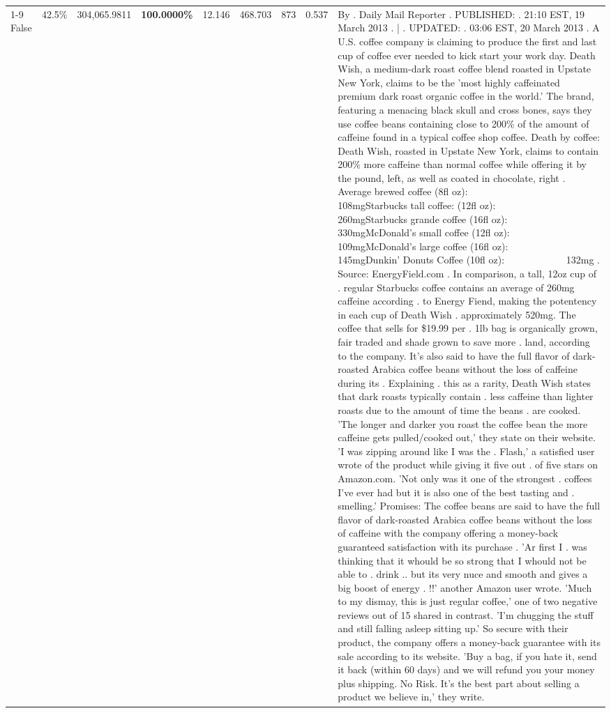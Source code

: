 \begin{table}[H]
{\begin{tabular}{lllrlllll}
\cline{1-9}
False & 42.5\% & 304,065.9811 & \bfseries \color{red} 100.0000\% & 12.146 & 468.703 & 873 & 0.537 & By . Daily Mail Reporter . PUBLISHED: . 21:10 EST, 19 March 2013 . | . UPDATED: . 03:06 EST, 20 March 2013 . A U.S. coffee company is claiming to produce the first and last cup of coffee ever needed to kick start your work day. Death Wish, a medium-dark roast coffee blend roasted in Upstate New York, claims to be the 'most highly caffeinated premium dark roast organic coffee in the world.' The brand, featuring a menacing black skull and cross bones, says they use coffee beans containing close to 200\% of the amount of caffeine found in a typical coffee shop coffee. Death by coffee: Death Wish, roasted in Upstate New York, claims to contain 200\% more caffeine than normal coffee while offering it by the pound, left, as well as coated in chocolate, right . Average brewed coffee (8fl oz):              108mgStarbucks tall coffee: (12fl oz):                260mgStarbucks grande coffee (16fl oz):         330mgMcDonald's small coffee (12fl oz):           109mgMcDonald's large coffee (16fl oz):           145mgDunkin' Donuts Coffee (10fl oz):             132mg . Source: EnergyField.com . In comparison, a tall, 12oz cup of . regular Starbucks coffee contains an average of 260mg caffeine according . to Energy Fiend, making the potentency in each cup of Death Wish . approximately 520mg. The coffee that sells for \$19.99 per . 1lb bag is organically grown, fair traded and shade grown to save more . land, according to the company. It's also said to have the full flavor of dark-roasted Arabica coffee beans without the loss of caffeine during its . Explaining . this as a rarity, Death Wish states that dark roasts typically contain . less caffeine than lighter roasts due to the amount of time the beans . are cooked. 'The longer and darker you roast the coffee bean the more caffeine gets pulled/cooked out,' they state on their website. 'I was zipping around like I was the . Flash,' a satisfied user wrote of the product while giving it five out . of five stars on Amazon.com. 'Not only was it one of the strongest . coffees I've ever had but it is also one of the best tasting and . smelling.’ Promises: The coffee beans are said to have the full flavor of dark-roasted Arabica coffee beans without the loss of caffeine with the company offering a money-back guaranteed satisfaction with its purchase . 'Ar first I . was thinking that it whould be so strong that I whould not be able to . drink .. but its very nuce and smooth and gives a big boost of energy . !!' another Amazon user wrote. 'Much to my dismay, this is just regular coffee,' one of two negative reviews out of 15 shared in contrast. 'I'm chugging the stuff and still falling asleep sitting up.' So secure with their product, the company offers a money-back guarantee with its sale according to its website. 'Buy a bag, if you hate it, send it back (within 60 days) and we will refund you your money plus shipping. No Risk. It’s the best part about selling a product we believe in,' they write.🦄 \\

\end{tabular}}
\end{table}
